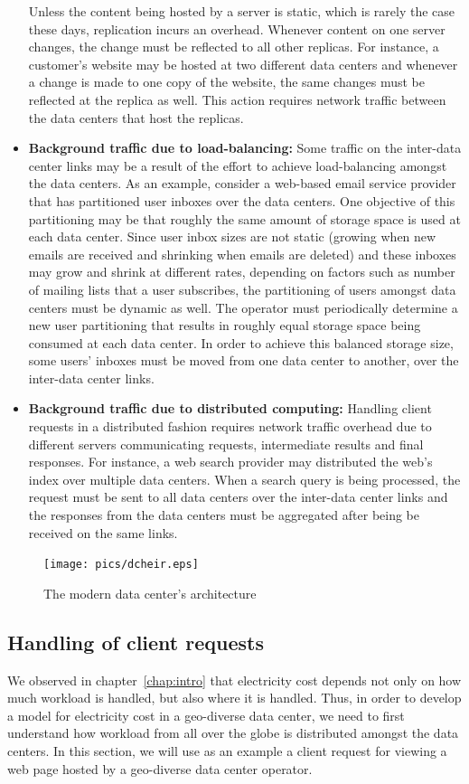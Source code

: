 \begin{itemize}
Unless the content being hosted by a server is static, which is rarely the case these days, replication incurs an overhead. Whenever content on one server changes, the change must be reflected to all other replicas. For instance, a customer's website may be hosted at two different data centers and whenever a change is made to one copy of the website, the same changes must be reflected at the replica as well. This action requires network traffic between the data centers that host the replicas. 
\item \textbf{Background traffic due to load-balancing:} Some traffic on the inter-data center links may be a result of the effort to achieve load-balancing amongst the data centers. As an example, consider a web-based email service provider that has partitioned user inboxes over the data centers. One objective of this partitioning may be that roughly the same amount of storage space is used at each data center. Since user inbox sizes are not static (growing when new emails are received and shrinking when emails are deleted) and these inboxes may grow and shrink at different rates, depending on factors such as number of mailing lists that a user subscribes, the partitioning of users amongst data centers must be dynamic as well. The operator must periodically determine a new user partitioning that results in roughly equal storage space being consumed at each data center. In order to achieve this balanced storage size, some users' inboxes must be moved from one data center to another, over the inter-data center links.
\item \textbf{Background traffic due to distributed computing:} Handling client requests in a distributed fashion requires network traffic overhead due to different servers communicating requests, intermediate results and final responses. For instance, a web search provider may distributed the web's index over multiple data centers. When a search query is being processed, the request must be sent to all data centers over the inter-data center links and the responses from the data centers must be aggregated after being be received on the same links.
\end{itemize}

\begin{figure}
\texttt{[image: pics/dcheir.eps]}
\caption{The modern data center's architecture}
\label{fig:dcheir}
\end{figure}

 

\subsection{Handling of client requests} 
We observed in chapter~\ref{chap:intro} that electricity cost depends not only on how much workload is handled, but also where it is handled. Thus, in order to develop a model for electricity cost in a geo-diverse data center, we need to first understand how workload from all over the globe is distributed amongst the data centers. In this section, we will use as an example a client request for viewing a web page hosted by a geo-diverse data center operator. 


